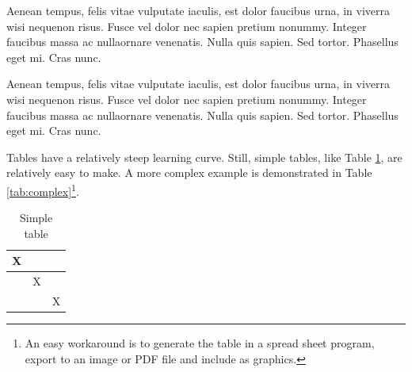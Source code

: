 Aenean tempus, felis vitae vulputate iaculis, est dolor faucibus urna, in viverra wisi nequenon risus. Fusce vel dolor nec sapien pretium nonummy. Integer faucibus massa ac nullaornare venenatis. Nulla quis sapien. Sed tortor. Phasellus eget mi. Cras nunc.

Aenean tempus, felis vitae vulputate iaculis, est dolor faucibus urna, in viverra wisi nequenon risus. Fusce vel dolor nec sapien pretium nonummy. Integer faucibus massa ac nullaornare venenatis. Nulla quis sapien. Sed tortor. Phasellus eget mi. Cras nunc.

Tables have a relatively steep learning curve.
Still, simple tables, like Table \ref{tab:simple}, are relatively easy to make.
A more complex example is demonstrated in Table \ref{tab:complex}\footnote{An easy workaround is to generate the table in a spread sheet program, export to an image or PDF file and include as graphics.}.

\begin{table}[!htbp]
\centering
\begin{tabular}{c|c|c}
X &  & \\
\hline
& X & \\
\hline
 &  & X \\
\end{tabular}
\caption{Simple table}
\label{tab:simple}
\end{table}

\begin{table}[!htbp]
\centering
{}
\caption{Complex table}
\label{tab:complex}
\end{table}


